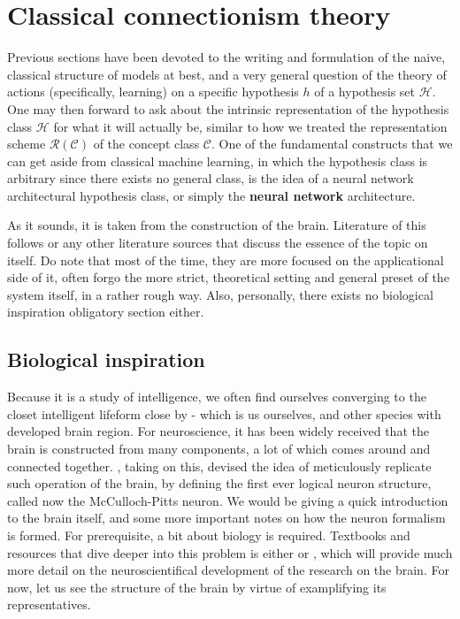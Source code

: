 \chapter{Classical connectionism theory}

Previous sections have been devoted to the writing and formulation of the naive, classical structure of models at best, and a very general question of the theory of actions (specifically, learning) on a specific hypothesis $h$ of a hypothesis set $\mathcal{H}$. One may then forward to ask about the intrinsic representation of the hypothesis class $\mathcal{H}$ for what it will actually be, similar to how we treated the representation scheme $\bm{\mathcal{R}}(\mathcal{C})$ of the concept class $\mathcal{C}$. One of the fundamental constructs that we can get aside from classical machine learning, in which the hypothesis class is arbitrary since there exists no general class, is the idea of a neural network architectural hypothesis class, or simply the \textbf{neural network} architecture. 

As it sounds, it is taken from the construction of the brain. Literature of this follows \cite{zhang2023divedeeplearning,10.5555/2721661} or any other literature sources that discuss the essence of the topic on itself. Do note that most of the time, they are more focused on the applicational side of it, often forgo the more strict, theoretical setting and general preset of the system itself, in a rather rough way. Also, personally, there exists no biological inspiration obligatory section either. 

\section{Biological inspiration}

Because it is a study of intelligence, we often find ourselves converging to the closet intelligent lifeform close by - which is us ourselves, and other species with developed brain region. For neuroscience, it has been widely received that the brain is constructed from many components, a lot of which comes around and connected together. \cite{mcculloch_logical_1943}, taking on this, devised the idea of meticulously replicate such operation of the brain, by defining the first ever logical neuron structure, called now the McCulloch-Pitts neuron. We would be giving a quick introduction to the brain itself, and some more important notes on how the neuron formalism is formed. For prerequisite, a bit about biology is required. Textbooks and resources that dive deeper into this problem is either \cite{1180370208} or \cite{purves_neuroscience_2004}, which will provide much more detail on the neuroscientifical development of the research on the brain. For now, let us see the structure of the brain by virtue of examplifying its representatives.

